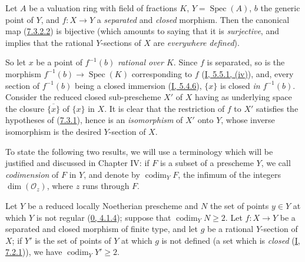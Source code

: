 \begin{proposition}[7.3.3]
\label{II.7.3.3}
Let $A$ be a valuation ring with field of fractions $K$,
$Y=\operatorname{Spec}(A)$, $b$ the generic point of $Y$, and $f:X\to Y$ a
\emph{separated} and \emph{closed} morphism. Then the canonical map
(\hyperref[II.7.3.2.2]{7.3.2.2}) is bijective (which amounts to saying
that it is \emph{surjective}, and implies that the rational $Y$-sections of
$X$ are \emph{everywhere defined}).
\end{proposition}

So let $x$ be a point of $f^{-1}(b)$ \emph{rational over $K$}. Since $f$ is
separated, so is the morphism
$f^{-1}(b)\to\operatorname{Spec}(K)$ corresponding to $f$
(\hyperref[I.5.5.1]{I, 5.5.1, (iv)}), and, every section of $f^{-1}(b)$
being a closed immersion (\hyperref[I.5.4.6]{I, 5.4.6}), $\{x\}$ is closed
\emph{in $f^{-1}(b)$}. Consider the reduced closed sub-prescheme $X'$ of
$X$ having as underlying space the closure $\overline{\{x\}}$ of $\{x\}$
in $X$. It is clear that the restriction of $f$ to $X'$ satisfies the hypotheses
of (\hyperref[II.7.3.1]{7.3.1}), hence is an \emph{isomorphism} of $X'$ onto
$Y$, whose inverse isomorphism is the desired $Y$-section of $X$.

\begin{env}[7.3.4]
\label{II.7.3.4}
To state the following two results, we will use a
terminology which will be justified and discussed in Chapter IV: if $F$ is
a subset
of a prescheme $Y$, we call \emph{codimension} of $F$ in $Y$, and denote by
$\operatorname{codim}_YF$, the infimum of the integers
$\dim(\mathcal{O}_z)$, where $z$ runs through $F$.
\end{env}

\begin{corollary}[7.3.5]
\label{II.7.3.5}
Let $Y$ be a reduced locally Noetherian prescheme and $N$ the set of
points $y\in Y$ at which $Y$ is not regular
(\hyperref[0.4.1.4]{0, 4.1.4}); suppose that
$\operatorname{codim}_YN\geq2$. Let $f:X\to Y$ be a separated and closed
morphism of finite type, and let $g$ be a rational $Y$-section of $X$; if $Y'$
is the set of points of $Y$ at which $g$ is not defined (a set which is
\emph{closed} (\hyperref[I.7.2.1]{I, 7.2.1})), we have
$\operatorname{codim}_YY'\geq2$.
\end{corollary}

